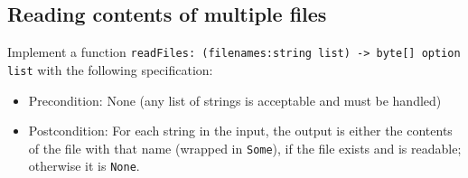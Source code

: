 \subsection*{Reading contents of multiple files}
 
Implement a function \texttt{readFiles: (filenames:string list) -> byte[] option list} with the following specification:
\begin{itemize}
\item Precondition: None (any list of strings is acceptable and must be handled)
\item Postcondition: For each string in the input, the output is either the contents of the file with that name (wrapped in \texttt{Some}), if the file exists and is readable; otherwise it is \texttt{None}.  
\end{itemize}
